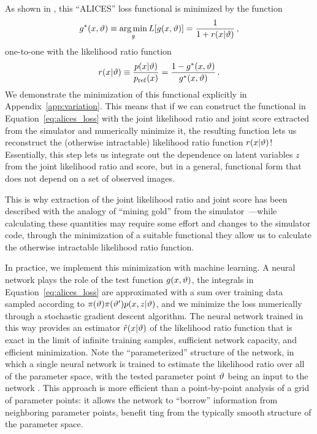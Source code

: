 \documentclass[twocolumn]{aastex63}
\begin{document}
As shown in \citet{Stoye:2018ovl}, this ``ALICES'' loss functional is minimized by the function
%
\begin{equation}
  g^*(x, \stattheta) \equiv \argmin_g L[g(x, \stattheta)] = \frac 1 {1 + r(x|\stattheta)} \,,
  \label{eq:loss_minimum}
\end{equation}
%
one-to-one with the likelihood ratio function
%
\begin{equation}
  r(x|\stattheta)
  \equiv \frac {p(x|\stattheta)} {p_\mathrm{ref}(x)}
  = \frac {1 - g^*(x, \stattheta)}{g^*(x, \stattheta)} \,.
\end{equation}
%
We demonstrate the minimization of this functional explicitly in Appendix~\ref{app:variation}. This means that if we can construct the functional in Equation~\eqref{eq:alices_loss} with the joint likelihood ratio and joint score extracted from the simulator and numerically minimize it, the resulting function lets us reconstruct the (otherwise intractable) likelihood ratio function $r(x|\vartheta)$! Essentially, this step lets us integrate out the dependence on latent variables $z$ from the joint likelihood ratio and score, but in a general, functional form that does not depend on a set of observed images.

This is why extraction of the joint likelihood ratio and joint score has been described with the analogy of ``mining gold'' from the simulator~\citep{1805.12244}---while calculating these quantities may require some effort and changes to the simulator code, through the minimization of a suitable functional they allow us to calculate the otherwise intractable likelihood ratio function.

In practice, we implement this minimization with machine learning. A neural network plays the role of the test function $g(x, \vartheta)$, the integrals in Equation~\eqref{eq:alices_loss} are approximated with a sum over training data sampled according to $\pi(\vartheta) \pi(\vartheta') p(x,z|\vartheta)$, and we minimize the loss numerically through a stochastic gradient descent algorithm. The neural network trained in this way provides an estimator $\hat{r}(x|\vartheta)$ of the likelihood ratio function that is exact in the limit of infinite training samples, sufficient network capacity, and efficient minimization. Note the ``parameterized'' structure of the network, in which a single neural network is trained to estimate the likelihood ratio over all of the parameter space, with the tested parameter point $\vartheta$ being an input to the network \citep{Cranmer:2015bka, Baldi:2016fzo}. This approach is more efficient than a point-by-point analysis of a grid of parameter points: it allows the network to ``borrow'' information from neighboring parameter points, benefit ting from the typically smooth structure of the parameter space.
\end{document}
